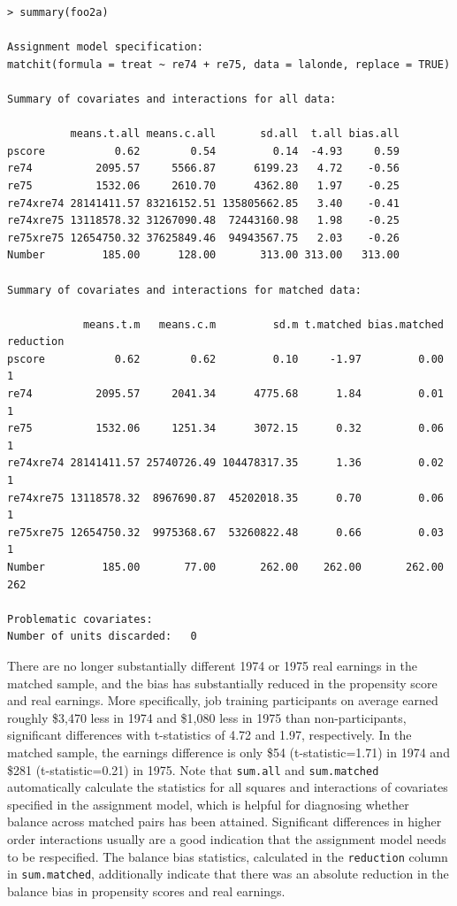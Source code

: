 \documentclass[oneside,letterpaper,titlepage]{article}
\begin{document}
\begin{footnotesize}
\begin{verbatim}
> summary(foo2a)

Assignment model specification:
matchit(formula = treat ~ re74 + re75, data = lalonde, replace = TRUE)

Summary of covariates and interactions for all data:

          means.t.all means.c.all       sd.all  t.all bias.all
pscore           0.62        0.54         0.14  -4.93     0.59
re74          2095.57     5566.87      6199.23   4.72    -0.56
re75          1532.06     2610.70      4362.80   1.97    -0.25
re74xre74 28141411.57 83216152.51 135805662.85   3.40    -0.41
re74xre75 13118578.32 31267090.48  72443160.98   1.98    -0.25
re75xre75 12654750.32 37625849.46  94943567.75   2.03    -0.26
Number         185.00      128.00       313.00 313.00   313.00

Summary of covariates and interactions for matched data:

            means.t.m   means.c.m         sd.m t.matched bias.matched reduction
pscore           0.62        0.62         0.10     -1.97         0.00         1
re74          2095.57     2041.34      4775.68      1.84         0.01         1
re75          1532.06     1251.34      3072.15      0.32         0.06         1
re74xre74 28141411.57 25740726.49 104478317.35      1.36         0.02         1
re74xre75 13118578.32  8967690.87  45202018.35      0.70         0.06         1
re75xre75 12654750.32  9975368.67  53260822.48      0.66         0.03         1
Number         185.00       77.00       262.00    262.00       262.00       262

Problematic covariates:  
Number of units discarded:   0
\end{verbatim}
\end{footnotesize}

There are no longer substantially different 1974 or 1975 real earnings in the
matched sample, and the bias has substantially reduced in the
propensity score and real earnings.  More specifically, job training
participants on average earned roughly \$3,470 less in 1974 and \$1,080 less in 1975 than
non-participants, significant differences with t-statistics of
4.72 and 1.97, respectively.  In the matched sample, the earnings difference
is only \$54 (t-statistic=1.71) in 1974 and \$281 (t-statistic=0.21)
in 1975.  Note that \texttt{sum.all} and
\texttt{sum.matched} automatically calculate the statistics for all
squares and interactions of covariates specified in the assignment
model, which is helpful for diagnosing whether balance across
matched pairs has been attained.  Significant differences in higher
order interactions usually are a good indication that the assignment
model needs to be respecified.  The balance bias statistics,
calculated in the 
\texttt{reduction} column in \texttt{sum.matched}, additionally
indicate that there was an absolute
reduction in the balance bias in propensity scores and real earnings.
\end{document}
